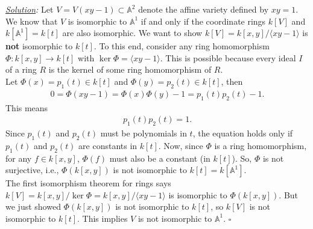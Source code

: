 \documentclass[12pt]{article}
\newcommand{\A}{\mathbb{A}}
\begin{document}
\noindent \textit{\underline{Solution}:} Let $V=V(xy-1)\subset \A^2$ denote the affine variety defined by $xy=1$. We know that $V$ is isomorphic to $\A^1$ if and only if the coordinate rings $k[V]$ and $k[\A^1] = k[t]$ are also isomorphic. We want to show $k[V] = k[x,y]/\langle xy-1\rangle$ is \textbf{not} isomorphic to $k[t]$. To this end, consider any ring homomorphism $\Phi: k[x,y] \to k[t]$ with $\ker\Phi = \langle xy-1\rangle$. This is possible because every ideal $I$ of a ring $R$ is the kernel of some ring homomorphism of $R$.\\

Let $\Phi(x) = p_1(t) \in k[t]$ and $\Phi(y) = p_2(t)\in k[t]$, then 
\begin{align*}
0 = \Phi(xy-1) = \Phi(x)\Phi(y)-1 = p_1(t)p_2(t) - 1. 
\end{align*}
This means 
\begin{align*}
p_1(t)p_2(t) = 1.
\end{align*}
Since $p_1(t)$ and $p_2(t)$ must be polynomials in $t$, the equation holds only if $p_1(t)$ and $p_2(t)$ are constants in $k[t]$. Now, since $\Phi$ is a ring homomorphism, for any $f\in k[x,y]$, $\Phi(f)$ must also be a constant (in $k[t]$). So, $\Phi$ is not surjective, i.e., $\Phi(k[x,y])$ is not isomorphic to $k[t] = k[\A^1]$. \\

The first isomorphism theorem for rings says $k[V] = k[x,y]/\ker \Phi = k[x,y]/\langle xy-1\rangle$ is isomorphic to $\Phi(k[x,y])$. But we just showed $\Phi(k[x,y])$ is not isomorphic to $k[t]$, so $k[V]$ is not isomorphic to $k[t]$. This implies $V$ is not isomorphic to $\A^1$.   \hfill$\square$


\newpage



















%
%
\end{document}
